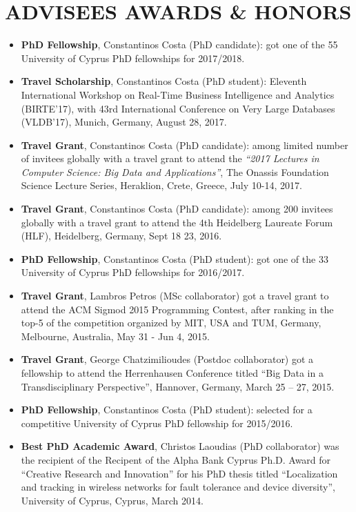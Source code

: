 \documentclass[10pt]{article}
\begin{document}
\section*{\bf ADVISEES AWARDS \& HONORS}
\setlength{\itemsep}{0.10ex}
\begin{itemize}
\item {\bf PhD Fellowship}, Constantinos Costa (PhD candidate): got one of the 55 University of  Cyprus PhD fellowships for 2017/2018.
\item {\bf Travel Scholarship}, Constantinos Costa (PhD student): Eleventh International Workshop on Real-Time Business Intelligence and Analytics (BIRTE'17), with 43rd International Conference on Very Large Databases (VLDB'17), Munich, Germany, August 28, 2017.
\item {\bf Travel Grant}, Constantinos Costa (PhD candidate): among limited number of invitees globally with a travel grant to attend the {\em ``2017 Lectures in Computer Science: Big Data and Applications''}, The Onassis Foundation Science Lecture Series, Heraklion, Crete, Greece, July 10-14, 2017.
\item {\bf Travel Grant}, Constantinos Costa (PhD candidate): among 200 invitees globally with a travel grant to attend the 4th Heidelberg Laureate Forum (HLF), Heidelberg, Germany, Sept 18 23, 2016.
\item {\bf PhD Fellowship}, Constantinos Costa (PhD student): got one of the 33 University of  Cyprus PhD fellowships for 2016/2017.
\item {\bf Travel Grant}, Lambros Petros (MSc collaborator) got a travel grant to attend the ACM Sigmod 2015 Programming Contest, after ranking in the top-5 of the competition organized by MIT, USA and TUM, Germany,  Melbourne, Australia, May 31 - Jun 4, 2015.
\item {\bf Travel Grant}, George Chatzimilioudes (Postdoc collaborator) got a fellowship to attend the Herrenhausen Conference titled ``Big Data in a Transdisciplinary Perspective'', Hannover, Germany, March 25 – 27, 2015.
\item {\bf PhD Fellowship}, Constantinos Costa (PhD student): selected for a competitive University of  Cyprus PhD fellowship for 2015/2016.
\item  {\bf Best PhD Academic Award}, Christos Laoudias (PhD collaborator) was the recipient of the Recipent of the Alpha Bank Cyprus Ph.D. Award for ``Creative Research and Innovation'' for his PhD thesis titled ``Localization and tracking in wireless networks for fault tolerance and device diversity'', University of Cyprus, Cyprus, March 2014.

\end{itemize}
\end{document}

